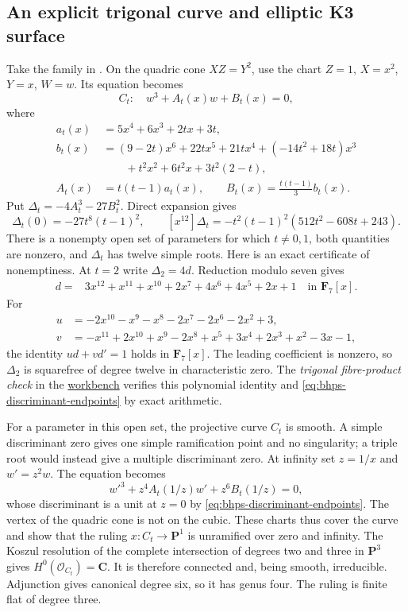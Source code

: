 \subsection{An explicit trigonal curve and elliptic K3 surface}

Take the family in
\cite[Theorem~1.2(ii), equation~(1.2)]{BHPS}.
On the quadric cone $XZ=Y^2$, use the chart
$Z=1$, $X=x^2$, $Y=x$, $W=w$.  Its equation becomes
\[
 C_t:\quad w^3+A_t(x)w+B_t(x)=0,
\]
where
\begin{align*}
 a_t(x)&=5x^4+6x^3+2tx+3t,\\
 b_t(x)&=(9-2t)x^6+22tx^5+21tx^4+(-14t^2+18t)x^3\\
       &\hspace{2em}+t^2x^2+6t^2x+3t^2(2-t),\\
 A_t(x)&=t(t-1)a_t(x),\qquad
 B_t(x)=\frac{t(t-1)}3b_t(x).
\end{align*}
Put $\Delta_t=-4A_t^3-27B_t^2$.  Direct expansion gives
\begin{equation}
 \Delta_t(0)=-27t^8(t-1)^2,
 \qquad [x^{12}]\Delta_t=-t^2(t-1)^2(512t^2-608t+243).
 \label{eq:bhps-discriminant-endpoints}
\end{equation}
There is a nonempty open set of parameters for which $t\ne0,1$,
both quantities are nonzero, and $\Delta_t$ has twelve simple roots.
Here is an exact certificate of nonemptiness.  At $t=2$ write
$\Delta_2=4d$.  Reduction modulo seven gives
\begin{align*}
 d={}&3x^{12}+x^{11}+x^{10}+2x^7+4x^6+4x^5+2x+1
                    \quad\text{in }\mathbf F_7[x].
\end{align*}
For
\begin{align*}
 u&=-2x^{10}-x^9-x^8-2x^7-2x^6-2x^2+3,\\
 v&=-x^{11}+2x^{10}+x^9-2x^8+x^5+3x^4+2x^3+x^2-3x-1,
\end{align*}
the identity $ud+vd'=1$ holds in $\mathbf F_7[x]$.
The leading coefficient is nonzero, so $\Delta_2$ is squarefree
of degree twelve in characteristic zero.  The
\emph{trigonal fibre-product check} in the
\href{\workbenchurl}{workbench} verifies this polynomial identity
and \eqref{eq:bhps-discriminant-endpoints} by exact arithmetic.

For a parameter in this open set, the projective curve $C_t$ is
smooth.  A simple discriminant zero gives one simple ramification
point and no singularity; a triple root would instead give a
multiple discriminant zero.  At infinity set $z=1/x$ and $w'=z^2w$.
The equation becomes
\[
 w'^3+z^4A_t(1/z)w'+z^6B_t(1/z)=0,
\]
whose discriminant is a unit at $z=0$ by
\eqref{eq:bhps-discriminant-endpoints}.
The vertex of the quadric cone is not on the cubic.
These charts thus cover the curve and show that the ruling
$x:C_t\to\mathbf P^1$ is unramified over zero and infinity.
The Koszul resolution of the complete intersection of degrees two
and three in $\mathbf P^3$ gives $H^0(\mathcal O_{C_t})=\mathbf C$.
It is therefore connected and, being smooth, irreducible.
Adjunction gives canonical degree six, so it has genus four.
The ruling is finite flat of degree three.

